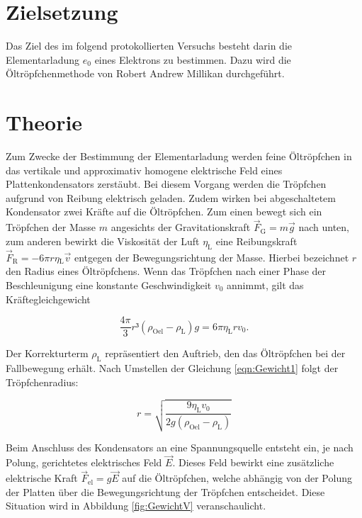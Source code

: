 %

%

\section{Zielsetzung}
\label{sec:Zielsetzung}

Das Ziel des im folgend protokollierten Versuchs besteht darin die Elementarladung $e_0$ eines Elektrons
zu bestimmen. Dazu wird die Öltröpfchenmethode von Robert Andrew Millikan durchgeführt.

\section{Theorie}
\label{sec:Theorie}

Zum Zwecke der Bestimmung der Elementarladung werden feine Öltröpfchen in das vertikale und approximativ 
homogene elektrische Feld eines Plattenkondensators zerstäubt. Bei diesem Vorgang werden die Tröpfchen
aufgrund von Reibung elektrisch geladen. Zudem wirken bei abgeschaltetem Kondensator zwei Kräfte auf die 
Öltröpfchen. Zum einen bewegt sich ein Tröpfchen der Masse $m$ angesichts der Gravitationskraft
$\vec{F}_\text{G} = m\vec{g}$ nach unten, zum anderen bewirkt die Viskosität der Luft $\eta_\text{L}$ eine 
Reibungskraft $\vec{F}_\text{R} = -6\pi{}r\eta{}_\text{L}\vec{v}$ entgegen der Bewegungsrichtung der Masse. 
Hierbei bezeichnet $r$ den Radius eines Öltröpfchens. Wenn das Tröpfchen nach einer Phase der Beschleunigung 
eine konstante Geschwindigkeit $v_0$ annimmt, gilt das Kräftegleichgewicht

\begin{equation}
\label{eqn:Gewicht1}
    \frac{4\pi}{3}r³\left(\rho_\text{Oel}-\rho_\text{L}\right)g = 6\pi{}\eta_\text{L}rv_0.
\end{equation}

\noindent Der Korrekturterm $\rho_\text{L}$ repräsentiert den Auftrieb, den das Öltröpfchen bei der
Fallbewegung erhält. Nach Umstellen der Gleichung \eqref{eqn:Gewicht1} folgt der Tröpfchenradius:

\begin{equation*}
    r = \sqrt{\frac{9\eta_\text{L}v_0}{2g\left(\rho_\text{Oel}-\rho_\text{L}\right)}}
\end{equation*}

\noindent Beim Anschluss des Kondensators an eine Spannungsquelle entsteht ein, je nach Polung, gerichtetes 
elektrisches Feld $\vec{E}$. Dieses Feld bewirkt eine zusätzliche elektrische Kraft $\vec{F}_\text{el} = g\vec{E}$
auf die Öltröpfchen, welche abhängig von der Polung der Platten über die Bewegungsrichtung der Tröpfchen entscheidet.
Diese Situation wird in Abbildung \ref{fig:GewichtV} veranschaulicht.

